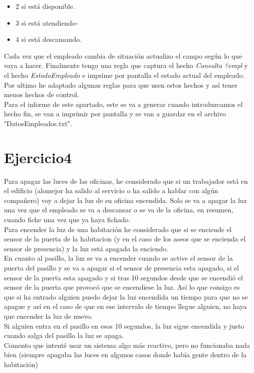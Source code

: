 \documentclass[10pt,spanish]{article}
\begin{document}
\begin{itemize}
\begin{itemize}
			\item 2 si está disponible.
			\item 3 si está atendiendo-
			\item 4 si está descansando.
		\end{itemize}
		Cada vez que el empleado cambia de situación actualizo el campo según lo que vaya a hacer.
		Finalmente tengo una regla que captura el hecho \textit{Consulta ?empl} y el hecho \textit{EstadoEmpleado} e imprime por pantalla el estado actual del empleado. \\
		Por ultimo he adaptado algunas reglas para que usen estos hechos y así tener menos hechos de control.
		\\Para el informe de este apartado, este se va a generar cuando introduzcamos el hecho fin, se van a imprimir por pantalla y se van a guardar en el archivo "DatosEmpleados.txt".
	\end{itemize}
	\section{Ejercicio4}
	Para apagar las luces de las oficinas, he considerado que si un trabajador está en el edificio (alomejor ha salido al servicio o ha salido a hablar con algún compañero) voy a dejar la luz de
	su oficina encendida. Solo se va a apagar la luz una vez que el empleado se va a descansar o se va de la oficina, en resumen, cuando fiche una vez que ya haya fichado.\\
	Para encender la luz de una habitación he considerado que si se enciende el sensor de la puerta de la habitacion (y en el caso de los aseos que se encienda el sensor de presencia) y la luz está apagada
	la enciendo. \\
	En cuanto al pasillo, la luz se va a encender cuando se active el sensor de la puerta del pasillo y se va a apagar si el sensor de presencia esta apagado, si el sensor de la puerta esta apagado y si tras 10 segundos desde que se encendió el sensor de la puerta que provocó que se encendiese la luz.
	Así lo que consigo es que si ha entrado alguien puedo dejar la luz encendida un tiempo para que no se apague y así en el caso de que en ese intervalo de tiempo llegue alguien, no haya que encender la luz de nuevo.\\
	Si alguien entra en el pasillo en esos 10 segundos, la luz sigue encendida y justo cuando salga del pasillo la luz se apaga.\\
	Comento que intenté usar un sistema algo más reactivo, pero no funcionaba nada bien (siempre apagaba las luces en algunos casos donde había gente dentro de la habitación)
\end{document}
